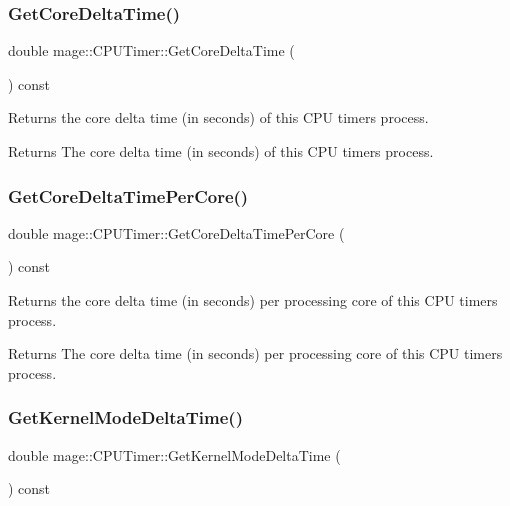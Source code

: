 \subsubsection{\texorpdfstring{Get\+Core\+Delta\+Time()}{GetCoreDeltaTime()}}
{\footnotesize\ttfamily double mage\+::\+C\+P\+U\+Timer\+::\+Get\+Core\+Delta\+Time (\begin{DoxyParamCaption}{ }\end{DoxyParamCaption}) const}

Returns the core delta time (in seconds) of this C\+PU timer\textquotesingle{}s process.

\begin{DoxyReturn}{Returns}
The core delta time (in seconds) of this C\+PU timer\textquotesingle{}s process. 
\end{DoxyReturn}
\hypertarget{classmage_1_1_c_p_u_timer_af7027d8e6d4c63fd75c207357b3ff2c1}{}\label{classmage_1_1_c_p_u_timer_af7027d8e6d4c63fd75c207357b3ff2c1} 
\subsubsection{\texorpdfstring{Get\+Core\+Delta\+Time\+Per\+Core()}{GetCoreDeltaTimePerCore()}}
{\footnotesize\ttfamily double mage\+::\+C\+P\+U\+Timer\+::\+Get\+Core\+Delta\+Time\+Per\+Core (\begin{DoxyParamCaption}{ }\end{DoxyParamCaption}) const}

Returns the core delta time (in seconds) per processing core of this C\+PU timer\textquotesingle{}s process.

\begin{DoxyReturn}{Returns}
The core delta time (in seconds) per processing core of this C\+PU timer\textquotesingle{}s process. 
\end{DoxyReturn}
\hypertarget{classmage_1_1_c_p_u_timer_a6bb5464996283d8ff2161cc683e8c0d1}{}\label{classmage_1_1_c_p_u_timer_a6bb5464996283d8ff2161cc683e8c0d1} 
\subsubsection{\texorpdfstring{Get\+Kernel\+Mode\+Delta\+Time()}{GetKernelModeDeltaTime()}}
{\footnotesize\ttfamily double mage\+::\+C\+P\+U\+Timer\+::\+Get\+Kernel\+Mode\+Delta\+Time (\begin{DoxyParamCaption}{ }\end{DoxyParamCaption}) const}

